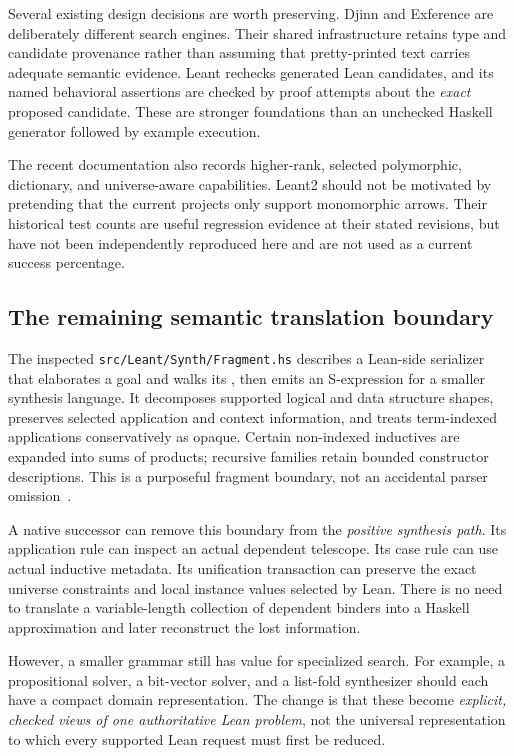 \documentclass[11pt,letterpaper]{article}
\newcommand{\id}[1]{\texttt{\detokenize{#1}}}
\newcommand{\pathref}[1]{\nolinkurl{#1}}
\theoremstyle{definition}
\theoremstyle{remark}
\begin{document}
Several existing design decisions are worth preserving. Djinn and Exference are deliberately different search engines. Their shared infrastructure retains type and candidate provenance rather than assuming that pretty-printed text carries adequate semantic evidence. Leant rechecks generated Lean candidates, and its named behavioral assertions are checked by proof attempts about the \emph{exact} proposed candidate. These are stronger foundations than an unchecked Haskell generator followed by example execution.

The recent documentation also records higher-rank, selected polymorphic, dictionary, and universe-aware capabilities. Leant2 should not be motivated by pretending that the current projects only support monomorphic arrows. Their historical test counts are useful regression evidence at their stated revisions, but have not been independently reproduced here and are not used as a current success percentage.

\subsection{The remaining semantic translation boundary}

The inspected \pathref{src/Leant/Synth/Fragment.hs} describes a Lean-side serializer that elaborates a goal and walks its \id{Expr}, then emits an S-expression for a smaller synthesis language. It decomposes supported logical and data structure shapes, preserves selected application and context information, and treats term-indexed applications conservatively as opaque. Certain non-indexed inductives are expanded into sums of products; recursive families retain bounded constructor descriptions. This is a purposeful fragment boundary, not an accidental parser omission~\cite{fragment}.

A native successor can remove this boundary from the \emph{positive synthesis path}. Its application rule can inspect an actual dependent telescope. Its case rule can use actual inductive metadata. Its unification transaction can preserve the exact universe constraints and local instance values selected by Lean. There is no need to translate a variable-length collection of dependent binders into a Haskell approximation and later reconstruct the lost information.

However, a smaller grammar still has value for specialized search. For example, a propositional solver, a bit-vector solver, and a list-fold synthesizer should each have a compact domain representation. The change is that these become \emph{explicit, checked views of one authoritative Lean problem}, not the universal representation to which every supported Lean request must first be reduced.
\end{document}
